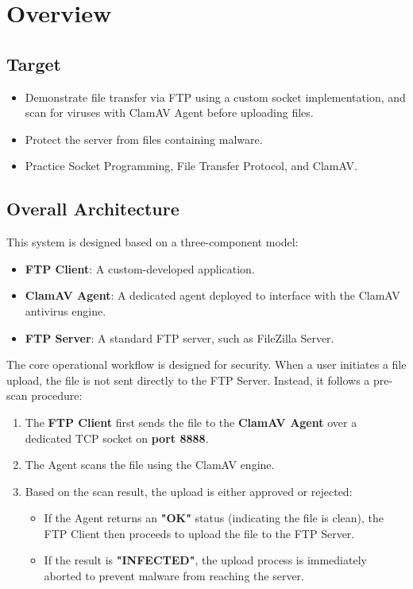 \section{Overview}
\subsection{Target}
\begin{itemize}
    \item Demonstrate file transfer via FTP using a custom socket implementation, and scan for viruses with ClamAV Agent before uploading files.
    \item Protect the server from files containing malware.
    \item Practice Socket Programming, File Transfer Protocol, and ClamAV.
\end{itemize}

\subsection{Overall Architecture}
This system is designed based on a three-component model:
\begin{itemize}
    \item \textbf{FTP Client}: A custom-developed application.
    \item \textbf{ClamAV Agent}: A dedicated agent deployed to interface with the ClamAV antivirus engine.
    \item \textbf{FTP Server}: A standard FTP server, such as FileZilla Server.
\end{itemize}

The core operational workflow is designed for security. When a user initiates a file upload, the file is not sent directly to the FTP Server. Instead, it follows a pre-scan procedure:
\begin{enumerate}
    \item The \textbf{FTP Client} first sends the file to the \textbf{ClamAV Agent} over a dedicated TCP socket on \textbf{port 8888}.
    \item The Agent scans the file using the ClamAV engine.
    \item Based on the scan result, the upload is either approved or rejected:
    \begin{itemize}
        \item If the Agent returns an \textbf{"OK"} status (indicating the file is clean), the FTP Client then proceeds to upload the file to the FTP Server.
        \item If the result is \textbf{"INFECTED"}, the upload process is immediately aborted to prevent malware from reaching the server.
    \end{itemize}
\end{enumerate}

